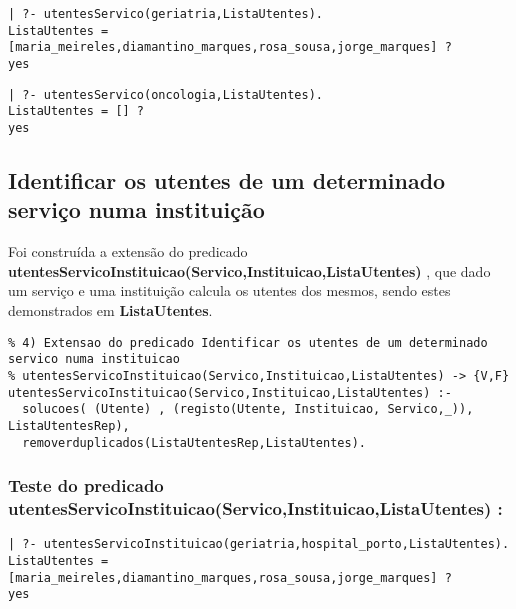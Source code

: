 \documentclass[
  oneside,
  10pt, a4paper,
  footinclude=true,
  headinclude=true,
  cleardoublepage=empty
]{scrbook}
\begin{document}
\begin{lstlisting}
| ?- utentesServico(geriatria,ListaUtentes).
ListaUtentes = [maria_meireles,diamantino_marques,rosa_sousa,jorge_marques] ? 
yes
\end{lstlisting}

\begin{lstlisting}
| ?- utentesServico(oncologia,ListaUtentes).
ListaUtentes = [] ? 
yes
\end{lstlisting}



















\subsection{Identificar os utentes de um determinado serviço numa instituição}



Foi construída a extensão do predicado \textbf{utentesServicoInstituicao(Servico,Instituicao,ListaUtentes) }, que dado um serviço e uma instituição calcula os utentes dos mesmos, sendo estes demonstrados em \textbf{ListaUtentes}.\par 
\begin{lstlisting}
% 4) Extensao do predicado Identificar os utentes de um determinado servico numa instituicao
% utentesServicoInstituicao(Servico,Instituicao,ListaUtentes) -> {V,F}
utentesServicoInstituicao(Servico,Instituicao,ListaUtentes) :-
  solucoes( (Utente) , (registo(Utente, Instituicao, Servico,_)), ListaUtentesRep),
  removerduplicados(ListaUtentesRep,ListaUtentes).
\end{lstlisting}


\subsubsection{Teste do predicado \textbf{utentesServicoInstituicao(Servico,Instituicao,ListaUtentes) }:}

\begin{lstlisting}
| ?- utentesServicoInstituicao(geriatria,hospital_porto,ListaUtentes).
ListaUtentes = [maria_meireles,diamantino_marques,rosa_sousa,jorge_marques] ? 
yes
\end{lstlisting}
\end{document}
